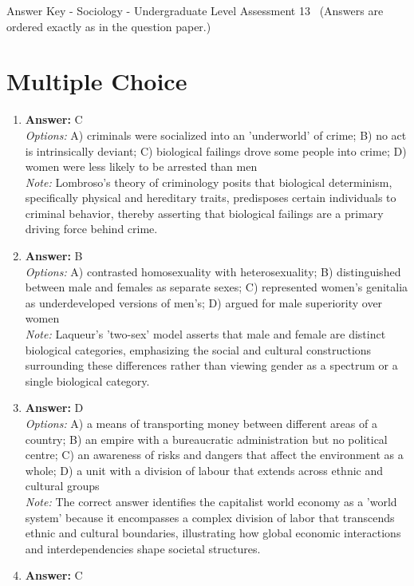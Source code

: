\documentclass[12pt]{article}
\begin{document}
\begin{center}
Answer Key - Sociology - Undergraduate Level Assessment 13 \
\small (Answers are ordered exactly as in the question paper.)
\end{center}

\section*{Multiple Choice}
\begin{enumerate}[label=\arabic*.]
\item \textbf{Answer:} C
\\ \textit{Options:} A) criminals were socialized into an 'underworld' of crime; B) no act is intrinsically deviant; C) biological failings drove some people into crime; D) women were less likely to be arrested than men
\\ \textit{Note:} Lombroso's theory of criminology posits that biological determinism, specifically physical and hereditary traits, predisposes certain individuals to criminal behavior, thereby asserting that biological failings are a primary driving force behind crime.
\item \textbf{Answer:} B
\\ \textit{Options:} A) contrasted homosexuality with heterosexuality; B) distinguished between male and females as separate sexes; C) represented women's genitalia as underdeveloped versions of men's; D) argued for male superiority over women
\\ \textit{Note:} Laqueur's 'two-sex' model asserts that male and female are distinct biological categories, emphasizing the social and cultural constructions surrounding these differences rather than viewing gender as a spectrum or a single biological category.
\item \textbf{Answer:} D
\\ \textit{Options:} A) a means of transporting money between different areas of a country; B) an empire with a bureaucratic administration but no political centre; C) an awareness of risks and dangers that affect the environment as a whole; D) a unit with a division of labour that extends across ethnic and cultural groups
\\ \textit{Note:} The correct answer identifies the capitalist world economy as a 'world system' because it encompasses a complex division of labor that transcends ethnic and cultural boundaries, illustrating how global economic interactions and interdependencies shape societal structures.
\item \textbf{Answer:} C

\end{enumerate}
\end{document}
